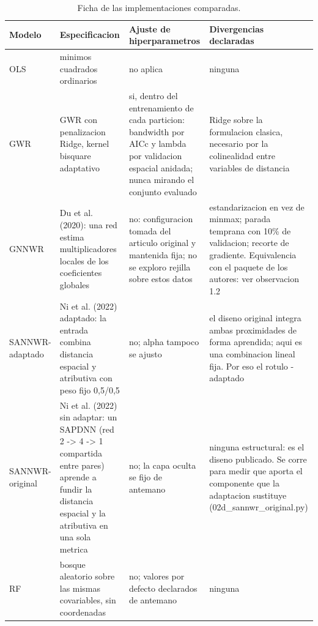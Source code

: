 \begin{table}[htbp]
\centering
\small
\caption{Ficha de las implementaciones comparadas.}
\label{tab:fichas-implementacion}
\begin{tabular}{p{2.2cm}p{4cm}p{4cm}p{4cm}}
\hline
Modelo & Especificacion & Ajuste de hiperparametros & Divergencias declaradas \\
\hline
OLS & minimos cuadrados ordinarios & no aplica & ninguna \\
GWR & GWR con penalizacion Ridge, kernel bisquare adaptativo & si, dentro del entrenamiento de cada particion: bandwidth por AICc y lambda por validacion espacial anidada; nunca mirando el conjunto evaluado & Ridge sobre la formulacion clasica, necesario por la colinealidad entre variables de distancia \\
GNNWR & Du et al. (2020): una red estima multiplicadores locales de los coeficientes globales & no: configuracion tomada del articulo original y mantenida fija; no se exploro rejilla sobre estos datos & estandarizacion en vez de minmax; parada temprana con 10\% de validacion; recorte de gradiente. Equivalencia con el paquete de los autores: ver observacion 1.2 \\
SANNWR-adaptado & Ni et al. (2022) adaptado: la entrada combina distancia espacial y atributiva con peso fijo 0,5/0,5 & no; alpha tampoco se ajusto & el diseno original integra ambas proximidades de forma aprendida; aqui es una combinacion lineal fija. Por eso el rotulo -adaptado \\
SANNWR-original & Ni et al. (2022) sin adaptar: un SAPDNN (red 2 -> 4 -> 1 compartida entre pares) aprende a fundir la distancia espacial y la atributiva en una sola metrica & no; la capa oculta se fijo de antemano & ninguna estructural: es el diseno publicado. Se corre para medir que aporta el componente que la adaptacion sustituye (02d\_sannwr\_original.py) \\
RF & bosque aleatorio sobre las mismas covariables, sin coordenadas & no; valores por defecto declarados de antemano & ninguna \\
\hline
\end{tabular}
\end{table}